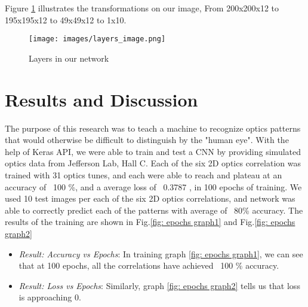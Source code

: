 \documentclass[conference]{IEEEtran}
\begin{document}
Figure \ref{fig: layers} illustrates the transformations on our image,
From 200x200x12 to 195x195x12 to 49x49x12 to 1x10.

\begin{figure}[h]
  \centering
  \texttt{[image: images/layers\_image.png]}
  \caption{Layers in our network\cite{Blender_Aug2021}}
  \label{fig: layers}
\end{figure}




\section{Results and Discussion}
\indent The purpose of this research was to teach a machine to recognize optics patterns that would otherwise be
difficult to distinguish by the "human eye". With the help of Keras API, we were able to train and test a CNN
by providing simulated optics data from Jefferson Lab, Hall C.  Each of the six 2D optics correlation was trained with
31 optics tunes, and each were able to reach and plateau at an accuracy of ~100 \%, and a average loss of ~0.3787 , in 100 epochs of training.
We used 10 test images per each of the six 2D optics correlations, and network was able to correctly predict each of the patterns with average of ~80\% accuracy. The results of the training are shown in Fig.\ref{fig: epochs graph1} and Fig.\ref{fig: epochs graph2}

\begin{itemize}
\item \emph{Result: Accuracy vs Epochs}: In training graph \ref{fig: epochs graph1}, we can see that at 100 epochs, all the correlations have achieved ~100 \% accuracy.
\item \emph{Result: Loss vs Epochs}: Similarly, graph \ref{fig: epochs graph2} tells us that loss is approaching $0$.
\end{itemize}
\end{document}

